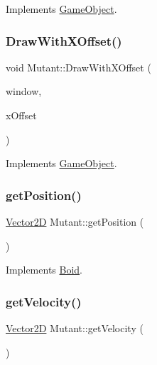 Implements \hyperlink{class_game_object_a0bd45eb831b3d0959eb498cad3e412ce}{Game\+Object}.

\hypertarget{class_mutant_a540fbecede166bd9c4ac68cbed72bc92}{}\label{class_mutant_a540fbecede166bd9c4ac68cbed72bc92} 
\subsubsection{\texorpdfstring{Draw\+With\+X\+Offset()}{DrawWithXOffset()}}
{\footnotesize\ttfamily void Mutant\+::\+Draw\+With\+X\+Offset (\begin{DoxyParamCaption}\item[{sf\+::\+Render\+Window \&}]{window,  }\item[{float}]{x\+Offset }\end{DoxyParamCaption})\hspace{0.3cm}{\ttfamily [virtual]}}



Implements \hyperlink{class_game_object_a8a3c07e92775fe00baa9e661fefb224e}{Game\+Object}.

\hypertarget{class_mutant_a9c3ab53037fc85159e02643ecfe46717}{}\label{class_mutant_a9c3ab53037fc85159e02643ecfe46717} 
\subsubsection{\texorpdfstring{get\+Position()}{getPosition()}}
{\footnotesize\ttfamily \hyperlink{class_vector2_d}{Vector2D} Mutant\+::get\+Position (\begin{DoxyParamCaption}{ }\end{DoxyParamCaption})\hspace{0.3cm}{\ttfamily [virtual]}}



Implements \hyperlink{class_boid_a32f7601f73e7a109bbd79d43b15d2272}{Boid}.

\hypertarget{class_mutant_af26928fa19102fe5ebea774819c4c565}{}\label{class_mutant_af26928fa19102fe5ebea774819c4c565} 
\subsubsection{\texorpdfstring{get\+Velocity()}{getVelocity()}}
{\footnotesize\ttfamily \hyperlink{class_vector2_d}{Vector2D} Mutant\+::get\+Velocity (\begin{DoxyParamCaption}{ }\end{DoxyParamCaption})\hspace{0.3cm}{\ttfamily [virtual]}}



